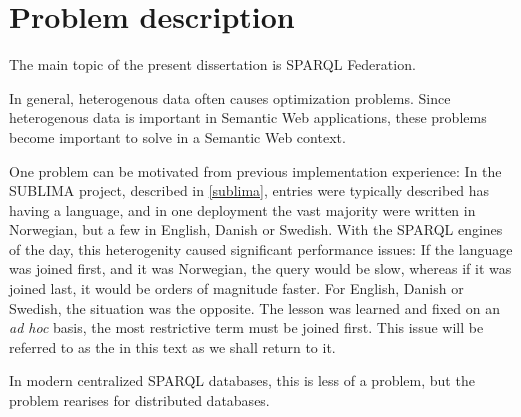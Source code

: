 \section{Problem description}

The main topic of the present dissertation is SPARQL
Federation.

In general, heterogenous data often causes optimization
problems. Since heterogenous data is important in Semantic Web
applications, these problems become important to solve in a Semantic
Web context.

One problem can be motivated from previous implementation experience:
In the SUBLIMA project, described in \ref{sublima}, entries were
typically described has having a language, and in one deployment the
vast majority were written in Norwegian, but a few in English, Danish
or Swedish. With the SPARQL engines of the day, this heterogenity
caused significant performance issues: If the language was joined
first, and it was Norwegian, the query would be slow, whereas if it
was joined last, it would be orders of magnitude faster. For English,
Danish or Swedish, the situation was the opposite. The lesson was
learned and fixed on an \textit{ad hoc} basis, the most restrictive
term must be joined first. This issue will be referred to as the
\langcase in this text as we shall return to it.

In modern centralized SPARQL databases, this is less of a problem, but
the problem rearises for distributed databases.

